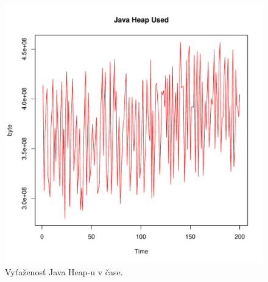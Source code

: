\documentclass[12pt,a4paper,oneside,final]{article}
\theoremstyle{definition}
\theoremstyle{remark}
\numberwithin{equation}{section}
\begin{document}
\begin{figure}[H] 
    \begin{center}
        \includegraphics[width=.8\textwidth]{images/heap_series.pdf}
        \caption{Vyťaženosť Java Heap-u v čase.}
        \label{obr:heap} %
    \end{center}
\end{figure}
\end{document}
